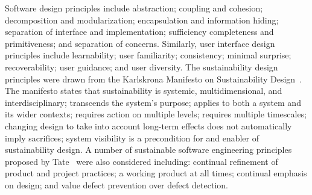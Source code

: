 Software design principles include abstraction; coupling and cohesion;
decomposition and modularization; encapsulation and information hiding;
separation of interface and implementation; sufficiency completeness and
primitiveness; and separation of concerns. Similarly, user interface design
principles include learnability; user familiarity; consistency; minimal
surprise; recoverability; user guidance; and user diversity. The sustainability
design principles were drawn from the Karlskrona Manifesto on Sustainability
Design~\cite{Becker:2014}. The manifesto states that sustainability is systemic,
multidimensional, and interdisciplinary; transcends the system's purpose; applies to
both a system and its wider contexts; requires action on multiple levels;
requires multiple timescales; changing design to take into account long-term
effects does not automatically imply sacrifices; system visibility is a
precondition for and enabler of sustainability design. A number of sustainable
software engineering principles proposed by Tate~\cite{tate:2005} were also
considered including: continual refinement of product and project practices; a
working product at all times; continual emphasis on design; and value defect
prevention over defect detection.

